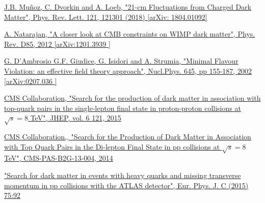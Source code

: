\documentclass[a4paper, 10pt, openright]{report}
\begin{document}
\begin{thebibliography}{1}
\href{https://arxiv.org/abs/1804.01092}{J.B. Mu\~{n}oz, C. Dvorkin and A. Loeb,
"21-cm Fluctuations from Charged Dark Matter",
Phys. Rev. Lett. 121, 121301 (2018) [arXiv: 1804.01092]}

\href{https://arxiv.org/abs/1201.3939}{A. Natarajan,
"A closer look at CMB constraints on WIMP dark matter",
Phys. Rev. D85, 2012 [arXiv:1201.3939 ]}

\href{https://arxiv.org/abs/hep-ph/0207036}{G. D'Ambrosio G.F. Giudice, G. Isidori and A. Strumia,
"Minimal Flavour Violation: an effective field theory approach",
Nucl.Phys. 645, pp 155-187, 2002 [arXiv:0207.036 ]}



\href{https://arxiv.org/abs/1504.03198}{CMS Collaboration,
"Search for the production of dark matter in association with top-quark pairs in the single-lepton final state in proton-proton collisions at $\sqrt{s} = 8$ TeV",
JHEP, vol. 6 121, 2015}

\href{http://inspirehep.net/record/1292446}{CMS Collaboration,,
"Search for the Production of Dark Matter in Association with Top Quark Pairs in the Di-lepton Final State in pp collisions at $\sqrt{s} = 8$ TeV",
CMS-PAS-B2G-13-004, 2014}

\href{https://arxiv.org/abs/1410.4031}{
"Search for dark matter in events with heavy quarks and missing transverse momentum in pp collisions with the ATLAS detector",
Eur. Phys. J. C (2015) 75:92}



\end{thebibliography}
\end{document}
